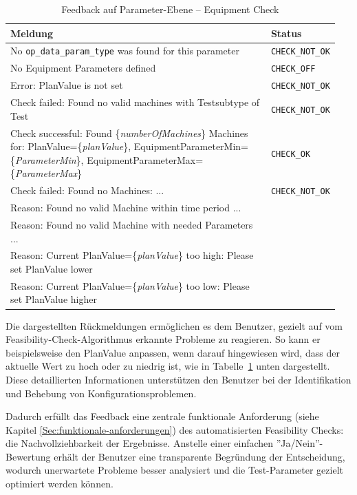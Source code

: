 \begin{table}[!htb]
    \centering
    \caption{Feedback auf Parameter-Ebene -- Equipment Check}
    \footnotesize
    \renewcommand{\arraystretch}{1.1}
    \begin{tabular}{p{0.8\linewidth} p{0.15\linewidth}}
        \textbf{Meldung} & \textbf{Status} \\
        \midrule
        No \texttt{op\_data\_param\_type} was found for this parameter & \texttt{CHECK\_NOT\_OK} \\
        \midrule
        No Equipment Parameters defined & \texttt{CHECK\_OFF} \\
        \midrule
        Error: PlanValue is not set & \texttt{CHECK\_NOT\_OK} \\
        \midrule
        Check failed: Found no valid machines with Testsubtype of Test & \texttt{CHECK\_NOT\_OK} \\
        \midrule
        Check successful: Found \{\textit{numberOfMachines}\} Machines for: PlanValue=\{\textit{planValue}\}, EquipmentParameterMin=\{\textit{ParameterMin}\}, EquipmentParameterMax=\{\textit{ParameterMax}\} & \texttt{CHECK\_OK} \\
        \midrule
        Check failed: Found no Machines: ... & \texttt{CHECK\_NOT\_OK} \\
        \quad Reason: Found no valid Machine within time period ... & \\
        \quad Reason: Found no valid Machine with needed Parameters ... & \\
        \quad Reason: Current PlanValue=\{\textit{planValue}\} too high: Please set PlanValue lower & \\
        \quad Reason: Current PlanValue=\{\textit{planValue}\} too low: Please set PlanValue higher & \\
        \bottomrule
    \end{tabular}
    \label{tab:feedback-equipment}
\end{table}



Die dargestellten Rückmeldungen ermöglichen es dem Benutzer, gezielt auf vom Feasibility-Check-Algorithmus erkannte Probleme zu reagieren. So kann er beispielsweise den PlanValue anpassen, wenn darauf hingewiesen wird, dass der aktuelle Wert zu hoch oder zu niedrig ist, wie in Tabelle~\ref{tab:feedback-equipment} unten dargestellt. Diese detaillierten Informationen unterstützen den Benutzer bei der Identifikation und Behebung von Konfigurationsproblemen. 

Dadurch erfüllt das Feedback eine zentrale funktionale Anforderung (siehe Kapitel \ref{Sec:funktionale-anforderungen}) des automatisierten Feasibility Checks: die Nachvollziehbarkeit der Ergebnisse. Anstelle einer einfachen ''Ja/Nein''-Bewertung erhält der Benutzer eine transparente Begründung der Entscheidung, wodurch unerwartete Probleme besser analysiert und die Test-Parameter gezielt optimiert werden können.